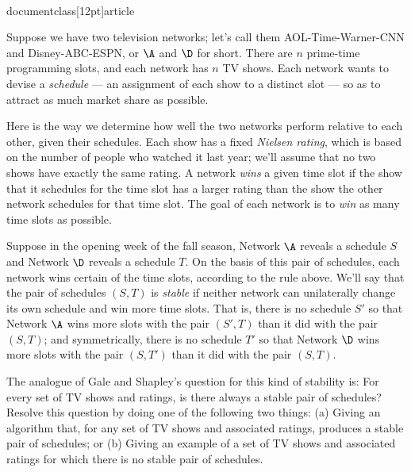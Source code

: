 \\documentclass[12pt]{article}
\begin{document}
\begin{enumerate}
Suppose we have two television networks;
let's call them AOL-Time-Warner-CNN and Disney-ABC-ESPN,
or $\A$ and $\D$ for short.
There are $n$ prime-time programming slots, and
each network has $n$ TV shows.
Each network wants to devise a {\em schedule} ---
an assignment of each show to a distinct slot ---
so as to attract as much market share as possible.

Here is the way we determine how well the two networks
perform relative to each other, given their schedules.
Each show has a fixed {\em Nielsen rating}, which is based on the number
of people who watched it last year;
we'll assume that no two shows have exactly the same rating.
A network {\em wins} a given time slot if the show
that it schedules for the time slot has a larger rating
than the show the other network schedules for that time slot.
The goal of each network is to
{\em win} as many time slots as possible.

Suppose in the opening week of the fall season,
Network $\A$ reveals a schedule $S$ and
Network $\D$ reveals a schedule $T$.
On the basis of this pair of schedules, each
network wins certain of the time slots,
according to the rule above.
We'll say that the pair of schedules $(S,T)$ is
{\em stable} if neither network can unilaterally
change its own schedule and win more time slots.
That is, there is no schedule $S'$ so that Network $\A$
wins more slots with the pair $(S',T)$ than it
did with the pair $(S,T)$;
and symmetrically, there is no schedule $T'$ so that Network $\D$
wins more slots with the pair $(S,T')$ than it
did with the pair $(S,T)$.

The analogue of Gale and Shapley's question for this
kind of stability is:
For every set of TV shows and ratings,
is there always a stable pair of schedules?
Resolve this question by doing one of the following two things:
(a) Giving an algorithm that, for any set of TV shows
and associated ratings, produces a stable pair of schedules;
or (b) Giving an example of a set of TV shows and associated ratings
for which there is no stable pair of schedules.

\end{enumerate}
\end{document}
